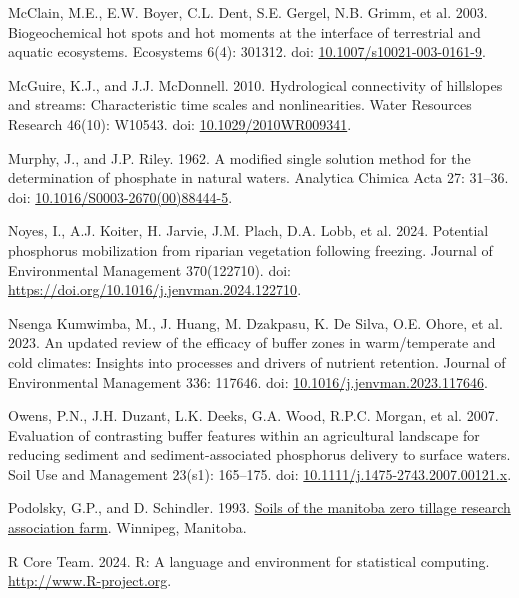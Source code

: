 \documentclass[
]{agujournal2019}
\newlength{\cslhangindent}
\newenvironment{CSLReferences}[2] %
 {\begin{list}{}{%
  \setlength{\itemindent}{0pt}
  \setlength{\leftmargin}{0pt}
  \setlength{\parsep}{0pt}
  \ifodd #1
   \setlength{\leftmargin}{\cslhangindent}
   \setlength{\itemindent}{-1\cslhangindent}
  \fi
  \setlength{\itemsep}{#2\baselineskip}}}
 {\end{list}}
\begin{document}
\begin{CSLReferences}{1}{1}
McClain, M.E., E.W. Boyer, C.L. Dent, S.E. Gergel, N.B. Grimm, et al.
2003. Biogeochemical hot spots and hot moments at the interface of
terrestrial and aquatic ecosystems. Ecosystems 6(4): 301312. doi:
\href{https://doi.org/10.1007/s10021-003-0161-9}{10.1007/s10021-003-0161-9}.

McGuire, K.J., and J.J. McDonnell. 2010. Hydrological connectivity of
hillslopes and streams: Characteristic time scales and nonlinearities.
Water Resources Research 46(10): W10543. doi:
\href{https://doi.org/10.1029/2010WR009341}{10.1029/2010WR009341}.

Murphy, J., and J.P. Riley. 1962. A modified single solution method for
the determination of phosphate in natural waters. Analytica Chimica Acta
27: 31--36. doi:
\href{https://doi.org/10.1016/S0003-2670(00)88444-5}{10.1016/S0003-2670(00)88444-5}.

Noyes, I., A.J. Koiter, H. Jarvie, J.M. Plach, D.A. Lobb, et al. 2024.
Potential phosphorus mobilization from riparian vegetation following
freezing. Journal of Environmental Management 370(122710). doi:
\url{https://doi.org/10.1016/j.jenvman.2024.122710}.

Nsenga Kumwimba, M., J. Huang, M. Dzakpasu, K. De Silva, O.E. Ohore, et
al. 2023. An updated review of the efficacy of buffer zones in
warm/temperate and cold climates: Insights into processes and drivers of
nutrient retention. Journal of Environmental Management 336: 117646.
doi:
\href{https://doi.org/10.1016/j.jenvman.2023.117646}{10.1016/j.jenvman.2023.117646}.

Owens, P.N., J.H. Duzant, L.K. Deeks, G.A. Wood, R.P.C. Morgan, et al.
2007. Evaluation of contrasting buffer features within an agricultural
landscape for reducing sediment and sediment-associated phosphorus
delivery to surface waters. Soil Use and Management 23(s1): 165--175.
doi:
\href{https://doi.org/10.1111/j.1475-2743.2007.00121.x}{10.1111/j.1475-2743.2007.00121.x}.

Podolsky, G.P., and D. Schindler. 1993.
\href{https://www.manitoba.ca/agriculture/soil/soil-survey/pubs/fss02s00943.pdf}{Soils
of the manitoba zero tillage research association farm}. Winnipeg,
Manitoba.

R Core Team. 2024. R: A language and environment for statistical
computing. \url{http://www.R-project.org}.


\end{CSLReferences}
\end{document}
